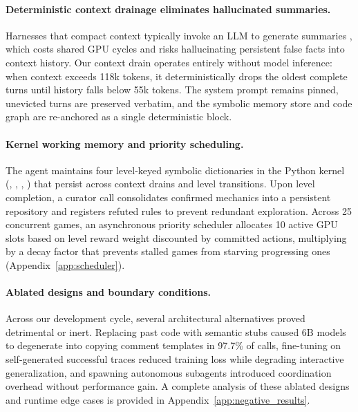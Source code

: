 \paragraph{Deterministic context drainage eliminates hallucinated summaries.}
Harnesses that compact context typically invoke an LLM to generate summaries \citep{knutsen2026arcgentica}, which costs shared GPU cycles and risks hallucinating persistent false facts into context history. Our context drain operates entirely without model inference: when context exceeds 118k tokens, it deterministically drops the oldest complete turns until history falls below 55k tokens. The system prompt remains pinned, unevicted turns are preserved verbatim, and the symbolic memory store and code graph are re-anchored as a single deterministic block.

\paragraph{Kernel working memory and priority scheduling.}
The agent maintains four level-keyed symbolic dictionaries in the Python kernel (, , , ) that persist across context drains and level transitions. Upon level completion, a curator call consolidates confirmed mechanics into a persistent  repository and registers refuted rules to prevent redundant exploration. Across 25 concurrent games, an asynchronous priority scheduler allocates 10 active GPU slots based on level reward weight discounted by committed actions, multiplying by a decay factor that prevents stalled games from starving progressing ones (Appendix~\ref{app:scheduler}).

\paragraph{Ablated designs and boundary conditions.}
Across our development cycle, several architectural alternatives proved detrimental or inert. Replacing past code with semantic stubs caused 6B models to degenerate into copying comment templates in 97.7\% of calls, fine-tuning on self-generated successful traces reduced training loss while degrading interactive generalization, and spawning autonomous subagents introduced coordination overhead without performance gain. A complete analysis of these ablated designs and runtime edge cases is provided in Appendix~\ref{app:negative_results}.
